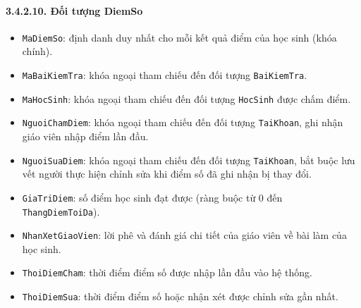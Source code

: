 \paragraph{3.4.2.10. Đối tượng DiemSo}\mbox{}
\begin{itemize}\setlength{\itemsep}{2pt}\setlength{\parskip}{0pt}
    \item \texttt{MaDiemSo}: định danh duy nhất cho mỗi kết quả điểm của học sinh (khóa chính).
    \item \texttt{MaBaiKiemTra}: khóa ngoại tham chiếu đến đối tượng \texttt{BaiKiemTra}.
    \item \texttt{MaHocSinh}: khóa ngoại tham chiếu đến đối tượng \texttt{HocSinh} được chấm điểm.
    \item \texttt{NguoiChamDiem}: khóa ngoại tham chiếu đến đối tượng \texttt{TaiKhoan}, ghi nhận giáo viên nhập điểm lần đầu.
    \item \texttt{NguoiSuaDiem}: khóa ngoại tham chiếu đến đối tượng \texttt{TaiKhoan}, bắt buộc lưu vết người thực hiện chỉnh sửa khi điểm số đã ghi nhận bị thay đổi.
    \item \texttt{GiaTriDiem}: số điểm học sinh đạt được (ràng buộc từ 0 đến \texttt{ThangDiemToiDa}).
    \item \texttt{NhanXetGiaoVien}: lời phê và đánh giá chi tiết của giáo viên về bài làm của học sinh.
    \item \texttt{ThoiDiemCham}: thời điểm điểm số được nhập lần đầu vào hệ thống.
    \item \texttt{ThoiDiemSua}: thời điểm điểm số hoặc nhận xét được chỉnh sửa gần nhất.
\end{itemize}

